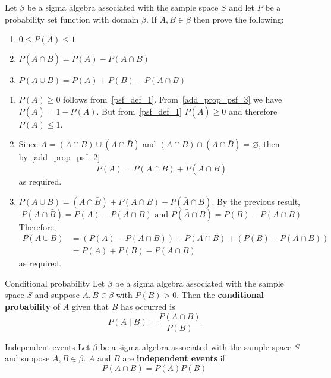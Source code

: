 \begin{Exercise}{}{}
    Let $ \beta $ be a sigma algebra associated with the sample space $ S $
    and let $ P $ be a probability set function with domain $ \beta $.
    If $ A,B\in\beta $ then prove the following:
    \begin{enumerate}
        \item $ 0\leqslant P(A)\leqslant 1 $
        \item $ P(A\cap\bar{B})=P(A)-P(A\cap B) $
        \item $ P(A\cup B)=P(A)+P(B)-P(A\cap B) $
    \end{enumerate}
\end{Exercise}
\begin{enumerate}
    \item $ P(A)\geqslant 0 $ follows from~\ref{psf_def_1}. From~\ref{add_prop_psf_3}
          we have $ P(\bar{A})=1-P(A) $. But from~\ref{psf_def_1} $ P(\bar{A})\geqslant 0 $
          and therefore $ P(A)\leqslant 1 $.
    \item Since $ A=(A\cap B)\cup (A\cap \bar{B}) $ and $ (A\cap B)\cap (A\cap \bar{B})
              =\varnothing $, then by~\ref{add_prop_psf_2}
          \[ P(A)=P(A\cap B)+P(A\cap\bar{B}) \]
          as required.
    \item $ P(A\cup B)=(A\cap \bar{B})+ P(A\cap B)+P(\bar{A}\cap B) $. By the previous
          result,
          \[ P(A\cap \bar{B})=P(A)-P(A\cap B) \text{ and } P(\bar{A}\cap B)=P(B)-P(A\cap B)\]
          Therefore,
          \begin{align*}
              P(A\cup B) & =(P(A)-P(A\cap B))+P(A\cap B)+(P(B)-P(A\cap B)) \\
                         & =P(A)+P(B)-P(A\cap B)
          \end{align*}
          as required.
\end{enumerate}

\begin{Definition}{Conditional probability}{}
    Let $ \beta $ be a sigma algebra associated with the sample space
    $ S $ and suppose $ A,B\in\beta $ with
    $ P(B)>0 $. Then the \textbf{conditional probability}
    of $ A $ given that $ B $ has occurred is
    \[ P(A\mid B)=\frac{P(A\cap B)}{P(B)} \]
\end{Definition}

\begin{Definition}{Independent events}{}
    Let $ \beta $ be a sigma algebra associated with the sample space
    $ S $ and suppose $ A,B\in\beta $. $ A $ and
    $ B $ are \textbf{independent events} if
    \[ P(A\cap B)=P(A)P(B) \]
\end{Definition}

